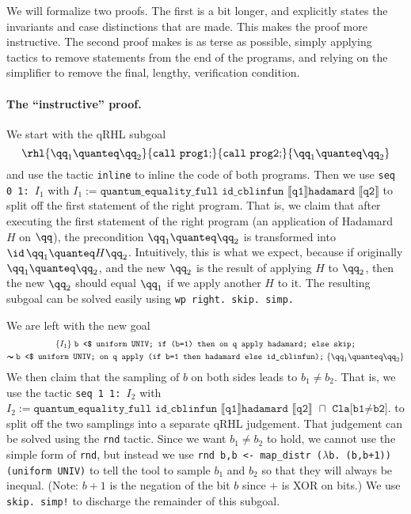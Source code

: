 \documentclass{article}
\begin{document}
We will formalize two proofs. The first is a bit longer, and
explicitly states the invariants and case distinctions that are
made. This makes the proof more instructive. The second proof makes is
as terse as possible, simply applying tactics to remove statements
from the end of the programs, and relying on the simplifier to remove
the final, lengthy, verification condition.

\paragraph{The ``instructive'' proof.} We start with the qRHL subgoal
\[
\rhl{\qq_1\quanteq \qq_2} {\mathtt{call\ prog1;}} {\mathtt{call\ prog2;}} {\qq_1\quanteq \qq_2}
\]
and use the tactic \texttt{inline} to inline the code of both
programs. Then we use \texttt{seq 0 1: $I_1$}
with
$I_1:=\texttt{quantum\_equality\_full id\_cblinfun
  $\llbracket$q1$\rrbracket$
  hadamard $\llbracket$q2$\rrbracket$}$
to split off the first statement of the right program. That is, we
claim that after executing the first statement of the right program
(an application of Hadamard $H$
on $\qq$),
the precondition $\qq_1\quanteq\qq_2$
is transformed into $\id\,\qq_1\quanteq H\qq_2$.
Intuitively, this is what we expect, because if originally
$\qq_1\quanteq \qq_2$,
and the new $\qq_2$
is the result of applying $H$
to $\qq_2$,
then the new $\qq_2$
should equal $\qq_1$
if we apply another $H$
to it. The resulting subgoal can be solved easily using \texttt{\frenchspacing wp
  right. skip. simp.}

We are left with the new goal
\begin{multline*}
  \{I_1\}\
  {\texttt{b <\$ uniform UNIV;
      if (b=1) then on q apply hadamard; else skip;}} \\
  \pmb\sim
  {\texttt{b <\$ uniform UNIV;
      on q apply (if b=1 then hadamard else id\_cblinfun);}}
  \
  \{\qq_1\quanteq\qq_2\}
\end{multline*}
We then claim that the sampling of $b$
on both sides leads to $b_1\neq b_2$.
That is, we use the tactic \texttt{seq 1 1: $I_2$}
with
$I_2:=\texttt{quantum\_equality\_full id\_cblinfun
  $\llbracket$q1$\rrbracket$
  hadamard $\llbracket$q2$\rrbracket$
  $\sqcap$ Cla[b1≠b2].}$ to split off the two samplings into a separate qRHL
judgement. That judgement can be solved using the \texttt{rnd}
tactic. Since we want $b_1\neq b_2$
to hold, we cannot use the simple form of \texttt{rnd}, but instead we
use \texttt{\frenchspacing rnd b,b <- map\_distr ($\lambda$b.
  (b,b+1)) (uniform UNIV)} to tell the tool to sample $b_1$
and $b_2$
so that they will always be inequal. (Note: $b+1$
is the negation of the bit $b$
since $+$
is XOR on bits.)  We use \texttt{\frenchspacing skip. simp!} to discharge the remainder of
this subgoal.
\end{document}

